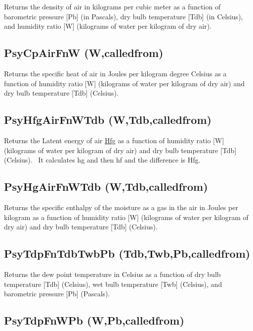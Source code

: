Returns the density of air in kilograms per cubic meter as a function of barometric pressure {[}Pb{]} (in Pascals), dry bulb temperature {[}Tdb{]} (in Celsius), and humidity ratio {[}W{]} (kilograms of water per kilogram of dry air).

\subsection{PsyCpAirFnW (W,calledfrom)}\label{psycpairfnw-wcalledfrom}

Returns the specific heat of air in Joules per kilogram degree Celsius as a function of humidity ratio {[}W{]} (kilograms of water per kilogram of dry air) and dry bulb temperature {[}Tdb{]} (Celsius).

\subsection{PsyHfgAirFnWTdb (W,Tdb,calledfrom)}\label{psyhfgairfnwtdb-wtdbcalledfrom}

Returns the Latent energy of air \href{Joules\%20per\%20kilogram}{Hfg} as a function of humidity ratio {[}W{]} (kilograms of water per kilogram of dry air) and dry bulb temperature {[}Tdb{]} (Celsius).~ It calculates hg and then hf and the difference is Hfg.

\subsection{PsyHgAirFnWTdb (W,Tdb,calledfrom)}\label{psyhgairfnwtdb-wtdbcalledfrom}

Returns the specific enthalpy of the moisture as a gas in the air in Joules per kilogram as a function of humidity ratio {[}W{]} (kilograms of water per kilogram of dry air) and dry bulb temperature {[}Tdb{]} (Celsius).

\subsection{PsyTdpFnTdbTwbPb (Tdb,Twb,Pb,calledfrom)}\label{psytdpfntdbtwbpb-tdbtwbpbcalledfrom}

Returns the dew point temperature in Celsius as a function of dry bulb temperature {[}Tdb{]} (Celsius), wet bulb temperature {[}Twb{]} (Celsius), and barometric pressure {[}Pb{]} (Pascals).

\subsection{PsyTdpFnWPb (W,Pb,calledfrom)}\label{psytdpfnwpb-wpbcalledfrom}

